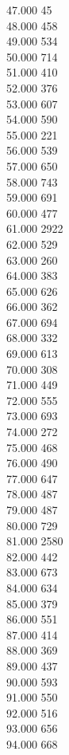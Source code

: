 { 47.000	45 \\
 48.000	458 \\
 49.000	534 \\
 50.000	714 \\
 51.000	410 \\
 52.000	376 \\
 53.000	607 \\
 54.000	590 \\
 55.000	221 \\
 56.000	539 \\
 57.000	650 \\
 58.000	743 \\
 59.000	691 \\
 60.000	477 \\
 61.000	2922 \\
 62.000	529 \\
 63.000	260 \\
 64.000	383 \\
 65.000	626 \\
 66.000	362 \\
 67.000	694 \\
 68.000	332 \\
 69.000	613 \\
 70.000	308 \\
 71.000	449 \\
 72.000	555 \\
 73.000	693 \\
 74.000	272 \\
 75.000	468 \\
 76.000	490 \\
 77.000	647 \\
 78.000	487 \\
 79.000	487 \\
 80.000	729 \\
 81.000	2580 \\
 82.000	442 \\
 83.000	673 \\
 84.000	634 \\
 85.000	379 \\
 86.000	551 \\
 87.000	414 \\
 88.000	369 \\
 89.000	437 \\
 90.000	593 \\
 91.000	550 \\
 92.000	516 \\
 93.000	656 \\
 94.000	668 \\
}
